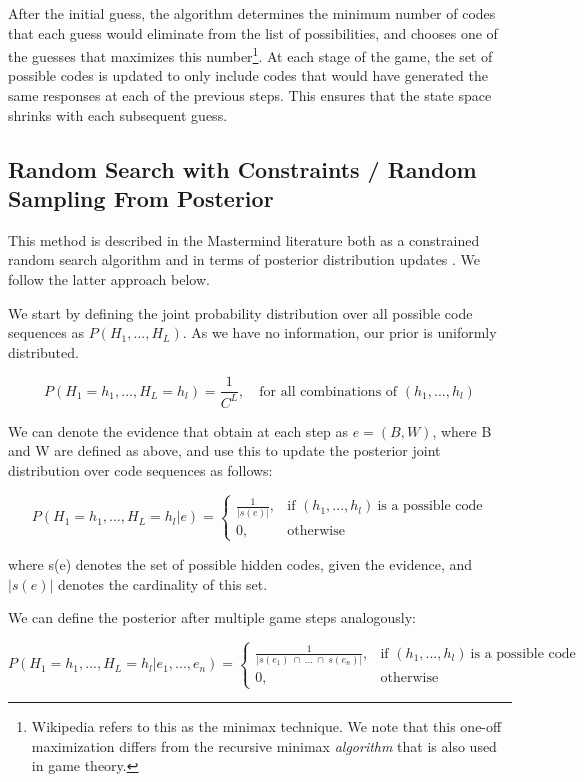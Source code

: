 \documentclass[11pt]{article}
\begin{document}
After the initial guess, the algorithm determines the minimum number of codes that each guess would eliminate from the list of possibilities, and chooses one of the guesses that maximizes this number\footnote{Wikipedia refers to this as the minimax technique. We note that this one-off maximization differs from the recursive minimax \textit{algorithm} that is also used in game theory.}. At each stage of the game, the set of possible codes is updated to only include codes that would have generated the same responses at each of the previous steps. This ensures that the state space shrinks with each subsequent guess.

\subsection{Random Search with Constraints / Random Sampling From Posterior}

This method is described in the Mastermind literature both as a constrained random search algorithm \cite{bernier1996solving} and in terms of posterior distribution updates \cite{vomlel2004bayesian}. We follow the latter approach below.

We start by defining the joint probability distribution over all possible code sequences as $P(H_1, ..., H_L)$. As we have no information, our prior is uniformly distributed.

\[
P(H_1=h_1, ..., H_L=h_l) = \frac{1}{C^L} ,\quad \text{for all combinations of }(h_1, ..., h_l)
\]

\noindent We can denote the evidence that obtain at each step as $e = (B, W)$, where B and W are defined as above, and use this to update the posterior joint distribution over code sequences as follows:

\[
    P(H_1=h_1, ..., H_L=h_l | e) = 
\begin{cases}
    \frac{1}{|s(e)|},& \text{if } (h_1, ..., h_l) \ \text{is a possible code}\\
    0,              & \text{otherwise}
\end{cases}
\]

\noindent where s(e) denotes the set of possible hidden codes, given the evidence, and $|s(e)|$ denotes the cardinality of this set. \medskip

\noindent We can define the posterior after multiple game steps analogously:

\[
    P(H_1=h_1, ..., H_L=h_l | e_1, ..., e_n) = 
\begin{cases}
    \frac{1}{| s(e_1) \ \cap \ ... \ \cap \ s(e_n) |},& \text{if } (h_1, ..., h_l) \ \text{is a possible code}\\
    0,              & \text{otherwise}
\end{cases}
\]
\end{document}
